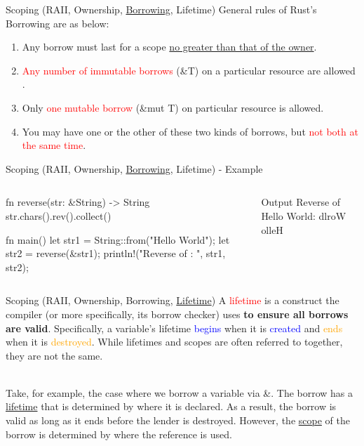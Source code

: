 \documentclass[10pt,xcolor={dvipsnames}, aspectratio=169]{beamer}
\begin{document}
	\begin{frame}{Scoping (RAII, Ownership, \underline{Borrowing}, Lifetime)}
	    General rules of Rust’s Borrowing are as below:
	    \begin{enumerate}
	        \item Any borrow must last for a scope \underline{no greater than that of the owner}.
	        \item \textcolor{red}{Any number of immutable borrows} (\&T) on a particular resource are allowed .
	        \item Only \textcolor{red}{one mutable borrow} (\&mut T) on particular resource is allowed.
	        \item You may have one or the other of these two kinds of borrows, but \textcolor{red}{not both at the same time}.
	    \end{enumerate}
	\end{frame}
	\begin{frame}[fragile]{Scoping (RAII, Ownership, \underline{Borrowing}, Lifetime) - Example}
		\begin{columns}[T]
			\begin{column}{0.5 \textwidth}
                \begin{rustcode}
    fn reverse(str: &String) -> String {
        str.chars().rev().collect()
    }
        
    fn main() {
        let str1 = String::from("Hello World");
        let str2 = reverse(&str1);
        println!("Reverse of {}: {}", str1, str2);
    }
                \end{rustcode}
			\end{column}
			\begin{column}{0.5 \textwidth}
			    \vspace{1cm}
				\begin{block}{Output}
					Reverse of Hello World: dlroW olleH
				\end{block}
			\end{column}
		\end{columns}
	\end{frame}
	\begin{frame}{Scoping (RAII, Ownership, Borrowing, \underline{Lifetime})}
		A \textcolor{red}{lifetime} is a construct the compiler (or more specifically, its borrow checker) uses \textbf{to ensure all borrows are valid}. Specifically, a variable's lifetime \textcolor{blue}{begins} when it is \textcolor{blue}{created} and \textcolor{orange}{ends} when it is \textcolor{orange}{destroyed}. While lifetimes and scopes are often referred to together, they are not the same.
		
		~\\Take, for example, the case where we borrow a variable via \&. The borrow has a \underline{lifetime} that is determined by where it is declared. As a result, the borrow is valid as long as it ends before the lender is destroyed. However, the \underline{scope} of the borrow is determined by where the reference is used.
	\end{frame}
\end{document}
